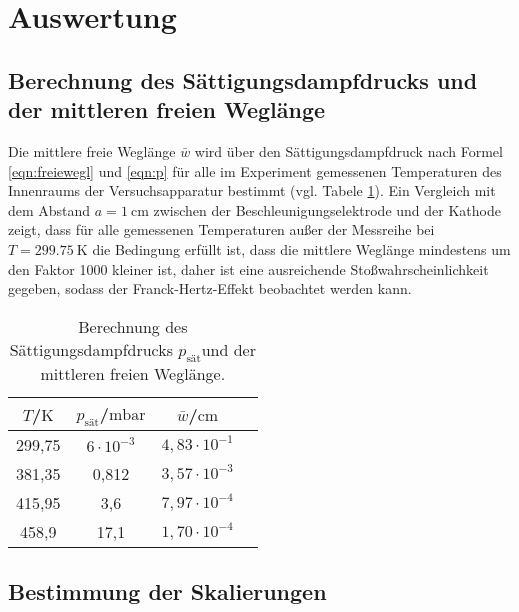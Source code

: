 \section{Auswertung}
\label{sec:Auswertung}
\FloatBarrier
\subsection{Berechnung des Sättigungsdampfdrucks und der mittleren freien Weglänge}
Die mittlere freie Weglänge $\bar{w}$ wird über den Sättigungsdampfdruck nach Formel \eqref{eqn:freiewegl} und \eqref{eqn:p} für alle im Experiment gemessenen Temperaturen des Innenraums der Versuchsapparatur bestimmt (vgl. Tabele \ref{tab:w}).
Ein Vergleich mit dem Abstand $a=\SI{1}{\centi\meter}$ zwischen der Beschleunigungselektrode und der Kathode zeigt, dass für alle gemessenen Temperaturen außer der Messreihe bei $T=\SI{299.75}{\kelvin}$ die Bedingung erfüllt ist, dass die mittlere Weglänge mindestens um den Faktor 1000 kleiner ist, daher ist eine ausreichende Stoßwahrscheinlichkeit gegeben, sodass der Franck-Hertz-Effekt beobachtet werden kann.
\begin{table}
	\centering
	\caption{Berechnung des Sättigungsdampfdrucks $p_\mathrm{sät}$und der mittleren freien Weglänge.}
	\label{tab:w}
\begin{tabular}{cccc}
\toprule
$T$/$\si{\kelvin}$ & $p_\mathrm{sät}$/$\si{\milli\bar}$ & $\bar{w}$/$\si{\centi\meter}$\\
\midrule
299,75 & $6\cdot10^{-3}$ & $4,83\cdot 10^{-1}$\\
381,35 & 0,812 & $3,57\cdot 10^{-3}$\\
415,95 & 3,6 & $7,97 \cdot 10^{-4}$\\%
458,9 & 17,1& $1,70\cdot 10^{-4}$\\
\bottomrule
\end{tabular}
\end{table}


\FloatBarrier
\subsection{Bestimmung der Skalierungen}
